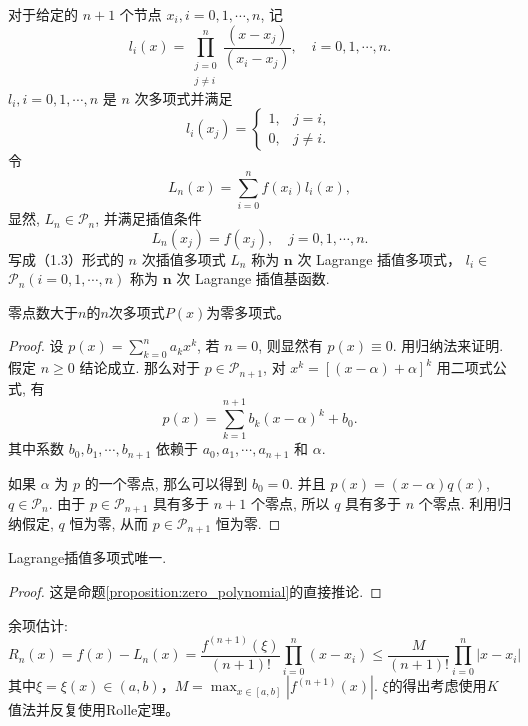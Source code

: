 对于给定的 $n+1$ 个节点 $x_i, i=0,1, \cdots, n$, 记
$$
    l_i(x)=\prod_{\substack{j=0 \\ j \neq i}}^n \frac{\left(x-x_j\right)}{\left(x_i-x_j\right)}, \quad i=0,1, \cdots, n .
$$
$l_i, i=0,1, \cdots, n$ 是 $n$ 次多项式并满足
$$
    l_i\left(x_j\right)= \begin{cases}1, & j=i, \\ 0, & j \neq i .\end{cases}
$$
令
$$
    L_n(x)=\sum_{i=0}^n f\left(x_i\right) l_i(x),
$$
显然, $L_n \in \mathscr{P}_n$, 并满足插值条件
$$
    L_n\left(x_j\right)=f\left(x_j\right), \quad j=0,1, \cdots, n .
$$
写成（1.3）形式的 $n$ 次插值多项式 $L_n$ 称为 $\boldsymbol{n}$ 次 Lagrange 插值多项式， $l_i \in$ $\mathscr{P}_n(i=0,1, \cdots, n)$ 称为 $\boldsymbol{n}$ 次 Lagrange 插值基函数.
\begin{proposition}[零多项式定理]\label{proposition:zero_polynomial}
    零点数大于$n$的$n$次多项式$P(x)$为零多项式。
\end{proposition}
\begin{proof}
    设 $p(x)=\sum_{k=0}^n a_k x^k$, 若 $n=0$, 则显然有 $p(x) \equiv 0$. 用归纳法来证明. 假定 $n \geqslant 0$ 结论成立. 那么对于 $p \in \mathscr{P}_{n+1}$, 对 $x^k=[(x-\alpha)+\alpha]^k$ 用二项式公式, 有
    $$
        p(x)=\sum_{k=1}^{n+1} b_k(x-\alpha)^k+b_0 .
    $$
    其中系数 $b_0, b_1, \cdots, b_{n+1}$ 依赖于 $a_0, a_1, \cdots, a_{n+1}$ 和 $\alpha$.

    如果 $\alpha$ 为 $p$ 的一个零点, 那么可以得到 $b_0=0$. 并且 $p(x)=(x-\alpha) q(x)$, $q \in \mathscr{P}_n$. 由于 $p \in \mathscr{P}_{n+1}$ 具有多于 $n+1$ 个零点, 所以 $q$ 具有多于 $n$ 个零点. 利用归纳假定, $q$ 恒为零, 从而 $p \in \mathscr{P}_{n+1}$ 恒为零.
\end{proof}
\begin{proposition}
    Lagrange插值多项式唯一.
\end{proposition}
\begin{proof}
    这是命题\ref{proposition:zero_polynomial}的直接推论.
\end{proof}
余项估计:
\[R_n(x)=f(x)-L_n(x)=\frac{f^{(n+1)}(\xi)}{(n+1)!}\prod_{i=0}^n(x-x_i)\le \frac{M}{(n+1)!}\prod_{i=0}^n|x-x_i|\]
其中$\xi=\xi(x)\in(a,b)$，$M=\max_{x\in[a,b]}|f^{(n+1)}(x)|$. $\xi$的得出考虑使用$K$值法并反复使用Rolle定理。
